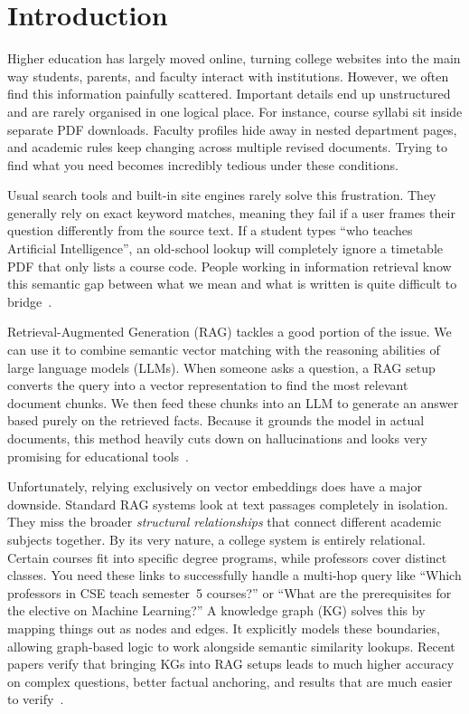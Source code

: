 \documentclass[12pt,a4paper]{report}
\begin{document}
\setcounter{page}{1}
\chapter{Introduction}

Higher education has largely moved online, turning college websites into the main way students, parents, and faculty interact with institutions. However, we often find this information painfully scattered. Important details end up unstructured and are rarely organised in one logical place. For instance, course syllabi sit inside separate PDF downloads. Faculty profiles hide away in nested department pages, and academic rules keep changing across multiple revised documents. Trying to find what you need becomes incredibly tedious under these conditions.

\par
Usual search tools and built-in site engines rarely solve this frustration. They generally rely on exact keyword matches, meaning they fail if a user frames their question differently from the source text. If a student types ``who teaches Artificial Intelligence'', an old-school lookup will completely ignore a timetable PDF that only lists a course code. People working in information retrieval know this semantic gap between what we mean and what is written is quite difficult to bridge~\cite{kg_rag_springer}.

\par
Retrieval-Augmented Generation (RAG) tackles a good portion of the issue. We can use it to combine semantic vector matching with the reasoning abilities of large language models (LLMs). When someone asks a question, a RAG setup converts the query into a vector representation to find the most relevant document chunks. We then feed these chunks into an LLM to generate an answer based purely on the retrieved facts. Because it grounds the model in actual documents, this method heavily cuts down on hallucinations and looks very promising for educational tools~\cite{rag_edu_elsevier}.

\par
Unfortunately, relying exclusively on vector embeddings does have a major downside. Standard RAG systems look at text passages completely in isolation. They miss the broader \textit{structural relationships} that connect different academic subjects together. By its very nature, a college system is entirely relational. Certain courses fit into specific degree programs, while professors cover distinct classes. You need these links to successfully handle a multi-hop query like ``Which professors in CSE teach semester~5 courses?'' or ``What are the prerequisites for the elective on Machine Learning?'' A knowledge graph (KG) solves this by mapping things out as nodes and edges. It explicitly models these boundaries, allowing graph-based logic to work alongside semantic similarity lookups. Recent papers verify that bringing KGs into RAG setups leads to much higher accuracy on complex questions, better factual anchoring, and results that are much easier to verify~\cite{kg_rag_springer}.
\end{document}
